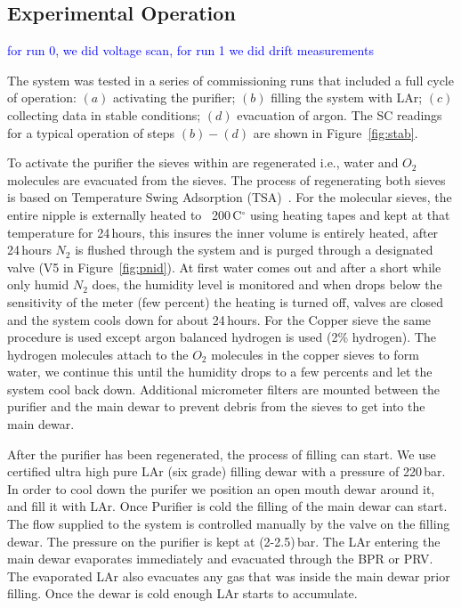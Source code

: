 \documentclass[a4paper,12pt]{article}
\newcommand{\RI}[1]{\textcolor{blue}{#1}}
\begin{document}
\subsection{Experimental Operation}
\label{sec:ExpOp}

\RI{for run 0, we did voltage scan, for run 1 we did drift measurements}

The system was tested  in a series of commissioning runs that included a full cycle of operation: $(a)$ activating the purifier;  $(b)$ filling the system with LAr; $(c)$ collecting data in stable conditions; $(d)$ evacuation of argon. The SC readings for a typical operation of steps $(b) - (d)$ are shown in Figure~\ref{fig:stab}.

To activate the purifier the sieves within are regenerated i.e., water and $O_2$ molecules are evacuated from the sieves. The process of regenerating both sieves is based on Temperature Swing Adsorption (TSA)~\cite{LeVan1989}. For the molecular sieves, the entire nipple is externally heated to ~200\,C$^{\circ}$ using heating tapes and kept at that temperature for 24\,hours, this insures the inner volume is entirely heated, after 24\,hours $N_2$ is flushed through the system and is purged through a designated valve (V5 in Figure~\ref{fig:pnid}). At first water comes out and after a short while only humid $N_2$ does, the humidity level is monitored and when drops below the sensitivity of the meter (few percent) the heating is turned off, valves are closed and the system cools down for about 24\,hours. For the Copper sieve the same procedure is used except argon balanced hydrogen is used (2\% hydrogen). The hydrogen molecules attach to the $O_2$ molecules in the copper sieves to form water, we continue this until the humidity drops to a few percents and let the system cool back down. Additional micrometer filters are mounted between the purifier and the main dewar to prevent debris from the sieves to get into the main dewar.

After the purifier has been regenerated, the process of filling can start. We use certified ultra high pure LAr (six grade) filling dewar with a pressure of 220\,bar. In order to cool down the purifer we position an open mouth dewar around it, and fill it with LAr. Once Purifier is cold the filling of the main dewar can start. The flow supplied to the system is controlled manually by the valve on the filling dewar. The pressure on the purifier is kept at (2-2.5)\,bar. The LAr entering the main dewar evaporates immediately and evacuated through the BPR or PRV. The evaporated LAr also evacuates any gas that was inside the main dewar prior filling. Once the dewar is cold enough LAr starts to accumulate.
\end{document}
